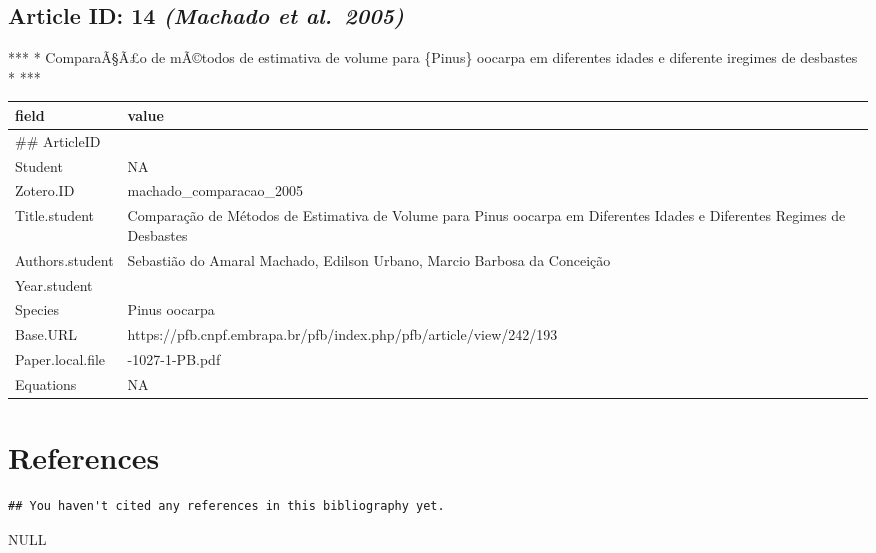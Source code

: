 \documentclass[]{article}
\begin{document}
\hypertarget{article-id-14-machado-et-al.2005}{%
\subsection{\texorpdfstring{Article ID: 14 \textbf{\emph{(Machado et
al.~2005)}}}{Article ID: 14 (Machado et al.~2005)}}\label{article-id-14-machado-et-al.2005}}

*** * ComparaÃ§Ã£o de mÃ©todos de estimativa de volume para \{Pinus\}
oocarpa em diferentes idades e diferente iregimes de desbastes * ***

\begin{table}[H]
\centering
\begin{tabular}{>{\raggedright\arraybackslash}p{2cm}>{\raggedright\arraybackslash}p{8cm}}
\toprule
field & value\\
\midrule
\#\# ArticleID & 14\\
Student & NA\\
Zotero.ID & machado\_comparacao\_2005\\
Title.student & Comparação de Métodos de Estimativa de Volume para Pinus oocarpa em Diferentes Idades e Diferentes Regimes de Desbastes\\
Authors.student & Sebastião do Amaral Machado, Edilson Urbano, Marcio Barbosa da Conceição\\
\addlinespace
Year.student & 2005\\
Species & Pinus oocarpa\\
Base.URL & https://pfb.cnpf.embrapa.br/pfb/index.php/pfb/article/view/242/193\\
Paper.local.file & 242-1027-1-PB.pdf\\
Equations & NA\\
\bottomrule
\end{tabular}
\end{table}

\hypertarget{references}{%
\section{References}\label{references}}

\begin{verbatim}
## You haven't cited any references in this bibliography yet.
\end{verbatim}

NULL
\end{document}
